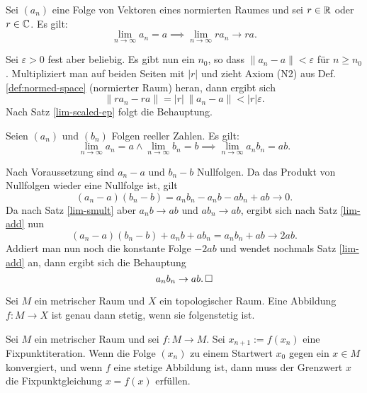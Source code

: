 \begin{Satz}\label{lim-smult}
Sei $(a_n)$ eine Folge von Vektoren eines normierten Raumes
und sei $r\in\mathbb R$ oder $r\in\mathbb C$. Es gilt:
\[\lim_{n\to\infty} a_n = a\implies \lim_{n\to\infty} ra_n\to ra.\]
\end{Satz}

\begin{Beweis}
Sei $\varepsilon>0$ fest aber beliebig. Es gibt nun ein $n_0$, so
dass $\|a_n-a\|<\varepsilon$ für $n\ge n_0$.
Multipliziert man auf beiden Seiten
mit $|r|$ und zieht Axiom (N2) aus
Def. \ref{def:normed-space} (normierter Raum)
heran, dann ergibt sich
\[\|ra_n-ra\| = |r|\,\|a_n-a\|<|r|\varepsilon.\]
Nach Satz \ref{lim-scaled-ep} folgt die Behauptung.\,\qedsymbol
\end{Beweis}

\begin{Satz}\newlinefirst
Seien $(a_n)$ und $(b_n)$ Folgen
reeller Zahlen. Es gilt:
\[\lim_{n\to\infty} a_n=a\land\lim_{n\to\infty} b_n=b\implies
\lim_{n\to\infty} a_n b_n = ab.\]
\end{Satz}

\begin{Beweis}
Nach Voraussetzung sind $a_n-a$ und $b_n-b$ Nullfolgen.
Da das Produkt von Nullfolgen wieder eine Nullfolge ist, gilt
\[(a_n-a)(b_n-b) = a_n b_n-a_n b-ab_n+ab\to 0.\]
Da nach Satz \ref{lim-smult} aber $a_n b\to ab$ und $ab_n\to ab$,
ergibt sich nach Satz \ref{lim-add} nun
\[(a_n-a)(b_n-b)+a_n b+ab_n = a_n b_n+ab\to 2ab.\]
Addiert man nun noch die konstante Folge $-2ab$
und wendet nochmals Satz \ref{lim-add} an, dann ergibt sich
die Behauptung
\[a_n b_n\to ab.\,\square\]
\end{Beweis}

\newpage
\begin{Satz}\label{cont-seqcont}%
Sei $M$ ein metrischer Raum und $X$ ein topologischer Raum.
Eine Abbildung $f\colon M\to X$ ist genau dann stetig, wenn
sie folgenstetig ist.
\end{Satz}

\begin{Satz}
Sei $M$ ein metrischer Raum und sei $f\colon M\to M$.
Sei $x_{n+1}:=f(x_n)$ eine Fixpunktiteration. Wenn die Folge
$(x_n)$ zu einem Startwert $x_0$ gegen ein $x\in M$ konvergiert, und
wenn $f$ eine stetige Abbildung ist, dann muss der Grenzwert $x$ die
Fixpunktgleichung $x=f(x)$ erfüllen.
\end{Satz}

